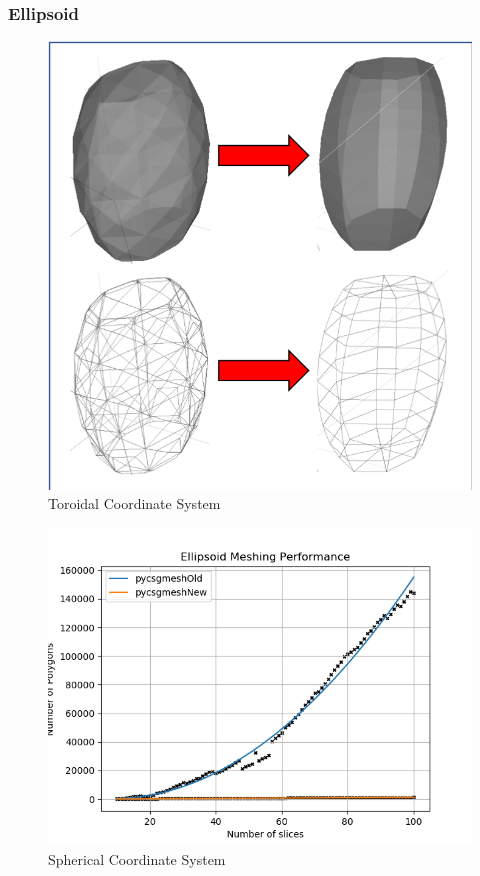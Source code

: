 \documentclass[12pt,a4paper]{article}
\begin{document}
\subsubsection{Ellipsoid}

\begin{figure}[h!]
\centering
\includegraphics[scale=0.5]{Images//Meshes//ellipsoid.png}
\caption[width=\columnwidth]{Toroidal Coordinate System}
\label{conts}
\end{figure}

\begin{figure}[h!]
\centering
\includegraphics[scale=0.5]{Images//Quad_fits//Ellipsoid_quad.png}
\caption[width=\columnwidth]{Spherical Coordinate System}
\label{conts}
\end{figure}
\end{document}

